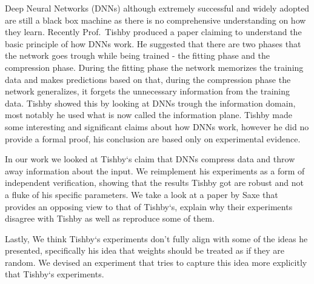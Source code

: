 Deep Neural Networks (DNNs) although extremely successful and widely adopted are
still a black box machine as there is no comprehensive understanding on how they
learn. Recently Prof.\ Tishby produced a paper claiming to understand the basic
principle of how DNNs work. He suggested that there are two phases that the
network goes trough while being trained - the fitting phase and the compression
phase. During the fitting phase the network memorizes the training data and
makes predictions based on that, during the compression phase the network
generalizes, it forgets the unnecessary information from the training data.
Tishby showed this by looking at DNNs trough the information domain, most
notably he used what is now called the information plane.
Tishby made some interesting and significant claims about how DNNs work, however
he did no provide a formal proof, his conclusion are based only on experimental
evidence. 

In our work we looked at Tishby`s claim that DNNs compress data and throw away
information about the input. We reimplement his experiments as a form of
independent verification, showing that the results Tishby got are robust and not
a fluke of his specific parameters. We take a look at a paper by Saxe that
provides an opposing view to that of Tishby`s, explain why their experiments
disagree with Tishby as well as reproduce some of them. 

Lastly, We think Tishby`s experiments don't fully align with some of the ideas
he presented, specifically his idea that weights should be treated as if they
are random. We devised an experiment that tries to capture this idea more
explicitly that Tishby`s experiments.
